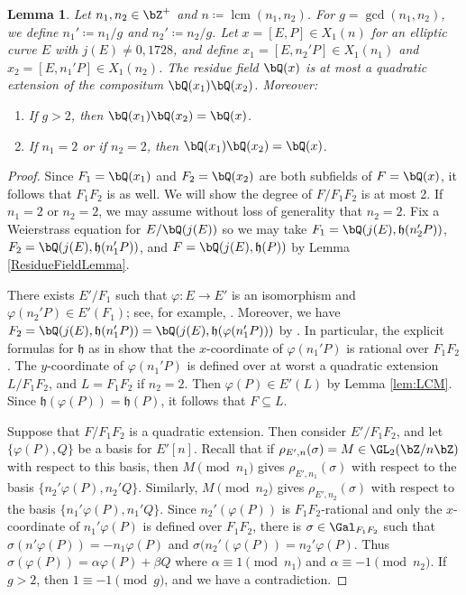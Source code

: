 \documentclass[11pt,reqno]{amsart}
\theoremstyle{plain}
\newtheorem{lemma}[theorem]{Lemma}
\theoremstyle{definition}
\DeclareMathOperator{\lcm}{lcm}
\newcommand{\Q}{\bQ}
\newcommand{\Z}{\bZ}
\begin{document}
\begin{lemma} \label{lem:compositum_res_fields}
Let $n_1,n_2 \in \Z^+$ and $n \coloneqq \lcm(n_1,n_2)$. For $g=\gcd(n_1,n_2)$, we define $n_1'\coloneqq n_1/g$ and $n_2'\coloneqq n_2/g$. Let $x=[E,P] \in X_1(n)$ for an elliptic curve $E$ with $j(E) \neq 0,1728$, and define $x_1=[E,n_2'P] \in X_1(n_1)$ and $x_2=[E,n_1'P] \in X_1(n_2)$. The residue field $\Q(x)$ is at most a quadratic extension of the compositum $\Q(x_1)\Q(x_2)$. Moreover:
\begin{enumerate}
\item If $g>2$, then $\Q(x_1)\Q(x_2)=\Q(x)$.
\item If $n_1=2$ or if $n_2=2$, then $\Q(x_1)\Q(x_2)=\Q(x)$.
\end{enumerate}
\end{lemma}

\begin{proof}
Since $F_1=\Q(x_1)$ and $F_2=\Q(x_2)$ are both subfields of $F=\Q(x)$, it follows that $F_1F_2$ is as well. We will show the degree of $F/F_1F_2$ is at most 2. If $n_1=2$ or $n_2=2$, we may assume without loss of generality that $n_2=2$. Fix a Weierstrass equation for $E/\Q(j(E))$ so we may take $F_1=\Q(j(E),\mathfrak{h}(n_2'P))$, $F_2=\Q(j(E),\mathfrak{h}(n_1'P))$, and $F=\Q(j(E),\mathfrak{h}(P))$ by Lemma \ref{ResidueFieldLemma}. 

There exists $E'/F_1$ such that $\varphi:E \rightarrow E'$ is an isomorphism and $\varphi(n_2'P) \in E'(F_1)$; see, for example, \cite[p. 274, Proposition VI.3.2]{DR}. Moreover, we have $F_2= \Q(j(E),\mathfrak{h}(n_1'P))=\Q(j(E),\mathfrak{h}(\varphi(n_1'P)))$ by \cite[p. 107]{shimura}. In particular, the explicit formulas for $\mathfrak{h}$ as in \cite[p. 107]{shimura} show that the $x$-coordinate of $\varphi(n_1'P)$ is rational over $F_1F_2$. The $y$-coordinate of $\varphi(n_1'P)$ is defined over at worst a quadratic extension $L/F_1F_2$, and $L=F_1F_2$ if $n_2=2$. Then $\varphi(P) \in E'(L)$ by Lemma \ref{lem:LCM}. Since $\mathfrak{h}(\varphi(P))=\mathfrak{h}(P)$, it follows that $F \subseteq L$.

Suppose that $F/F_1F_2$ is a quadratic extension. Then consider $E'/F_1F_2$, and let $\{\varphi(P),Q\}$ be a basis for $E'[n]$. Recall that if $\rho_{E',n}(\sigma)=M \in \GL_2(\Z/n\Z)$ with respect to this basis, then $M \pmod{n_1}$ gives $\rho_{E',n_1}(\sigma)$ with respect to the basis $\{n_2'\varphi(P),n_2'Q\}$. Similarly, $M\pmod{n_2}$ gives $\rho_{E',n_2}(\sigma)$ with respect to the basis $\{n_1'\varphi(P),n_1'Q\}$.  Since $n_2'(\varphi(P))$ is $F_1F_2$-rational and only the $x$-coordinate of $n_1'\varphi(P)$ is defined over $F_1F_2$, there is $\sigma\in \Gal_{F_1F_2}$ such that $\sigma(n'\varphi(P))=-n_1\varphi(P)$ and $\sigma(n_2'(\varphi(P))=n_2'\varphi(P)$. Thus $\sigma(\varphi(P))=\alpha \varphi(P)+\beta Q$ where $\alpha \equiv 1 \pmod{n_1}$ and $\alpha \equiv -1 \pmod{n_2}$. If $g>2$, then $1 \equiv -1 \pmod{g}$, and we have a contradiction.
\end{proof}
\end{document}
